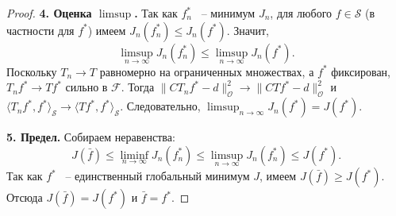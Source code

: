 \documentclass[a4paper,14pt,oneside,openany]{extarticle}
\begin{document}
\begin{proof}
\textbf{4. Оценка $\limsup$.}
Так как $f_n^*$ ~-- минимум $J_n$, для любого $f \in \mathcal{S}$ (в частности для $f^*$) имеем 
$J_n(f_n^*) \le J_n(f^*)$. Значит,
\begin{equation}
    \limsup_{n\to\infty} J_n(f_n^*) \le \limsup_{n\to\infty} J_n(f^*).
\end{equation}
Поскольку $T_n \to T$ равномерно на ограниченных множествах, а $f^*$ фиксирован, $T_n f^* \to 
T f^*$ сильно в $\mathcal{F}$. Тогда $\|C T_n f^* - d\|_{\mathcal{O}}^2 \to 
\|C T f^* - d\|_{\mathcal{O}}^2$ и $\langle T_n f^*, f^*\rangle_{\mathcal{S}} 
\to \langle T f^*, f^*\rangle_{\mathcal{S}}$. Следовательно, $\limsup_{n\to\infty} J_n(f^*) = J(f^*)$.

\textbf{5. Предел.}
Собираем неравенства:
\begin{equation}
    J(\bar f) \le \liminf_{n\to\infty} J_n(f_n^*) \le \limsup_{n\to\infty} J_n(f_n^*) \le J(f^*).
\end{equation}
Так как $f^*$ ~-- единственный глобальный минимум $J$, имеем $J(\bar f) \ge J(f^*)$. 
Отсюда $J(\bar f) = J(f^*)$ и $\bar f = f^*$.


\end{proof}
\end{document}
